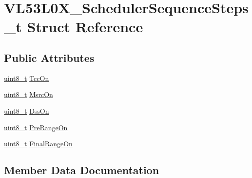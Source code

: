 \hypertarget{structVL53L0X__SchedulerSequenceSteps__t}{}\section{V\+L53\+L0\+X\+\_\+\+Scheduler\+Sequence\+Steps\+\_\+t Struct Reference}
\label{structVL53L0X__SchedulerSequenceSteps__t}
\subsection*{Public Attributes}
\begin{DoxyCompactItemize}
\item 
\hyperlink{vl53l0x__types_8h_aba7bc1797add20fe3efdf37ced1182c5}{uint8\+\_\+t} \hyperlink{structVL53L0X__SchedulerSequenceSteps__t_ad09b2b45d76b1c173b16b88f68bc8503}{Tcc\+On}
\item 
\hyperlink{vl53l0x__types_8h_aba7bc1797add20fe3efdf37ced1182c5}{uint8\+\_\+t} \hyperlink{structVL53L0X__SchedulerSequenceSteps__t_a89e488c686e57ba220c354ae4081b967}{Msrc\+On}
\item 
\hyperlink{vl53l0x__types_8h_aba7bc1797add20fe3efdf37ced1182c5}{uint8\+\_\+t} \hyperlink{structVL53L0X__SchedulerSequenceSteps__t_a3267b840f4cb5934247b62aa7eed77cd}{Dss\+On}
\item 
\hyperlink{vl53l0x__types_8h_aba7bc1797add20fe3efdf37ced1182c5}{uint8\+\_\+t} \hyperlink{structVL53L0X__SchedulerSequenceSteps__t_a5dd08b4e71fb266a80e091d748f9d574}{Pre\+Range\+On}
\item 
\hyperlink{vl53l0x__types_8h_aba7bc1797add20fe3efdf37ced1182c5}{uint8\+\_\+t} \hyperlink{structVL53L0X__SchedulerSequenceSteps__t_a5bbbf28181b4463620b7f5d13b354b0a}{Final\+Range\+On}
\end{DoxyCompactItemize}


\subsection{Member Data Documentation}
\mbox{\label{structVL53L0X__SchedulerSequenceSteps__t_a3267b840f4cb5934247b62aa7eed77cd}} 
